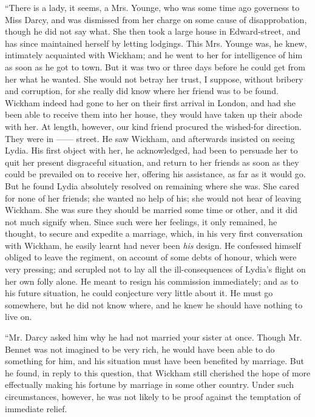 “There is a lady, it seems, a Mrs. Younge, who was some time ago governess to Miss Darcy, and was dismissed from her charge on some cause of disapprobation, though he did not say what. She then took a large house in Edward-street, and has since maintained herself by letting lodgings. This Mrs. Younge was, he knew, intimately acquainted with Wickham; and he went to her for intelligence of him as soon as he got to town. But it was two or three days before he could get from her what he wanted. She would not betray her trust, I suppose, without bribery and corruption, for she really did know where her friend was to be found. Wickham indeed had gone to her on their first arrival in London, and had she been able to receive them into her house, they would have taken up their abode with her. At length, however, our kind friend procured the wished-for direction. They were in ------ street. He saw Wickham, and afterwards insisted on seeing Lydia. His first object with her, he acknowledged, had been to persuade her to quit her present disgraceful situation, and return to her friends as soon as they could be prevailed on to receive her, offering his assistance, as far as it would go. But he found Lydia absolutely resolved on remaining where she was. She cared for none of her friends; she wanted no help of his; she would not hear of leaving Wickham. She was sure they should be married some time or other, and it did not much signify when. Since such were her feelings, it only remained, he thought, to secure and expedite a marriage, which, in his very first conversation with Wickham, he easily learnt had never been {\em his} design. He confessed himself obliged to leave the regiment, on account of some debts of honour, which were very pressing; and scrupled not to lay all the ill-consequences of Lydia's flight on her own folly alone. He meant to resign his commission immediately; and as to his future situation, he could conjecture very little about it. He must go somewhere, but he did not know where, and he knew he should have nothing to live on.

“Mr. Darcy asked him why he had not married your sister at once. Though Mr. Bennet was not imagined to be very rich, he would have been able to do something for him, and his situation must have been benefited by marriage. But he found, in reply to this question, that Wickham still cherished the hope of more effectually making his fortune by marriage in some other country. Under such circumstances, however, he was not likely to be proof against the temptation of immediate relief.

